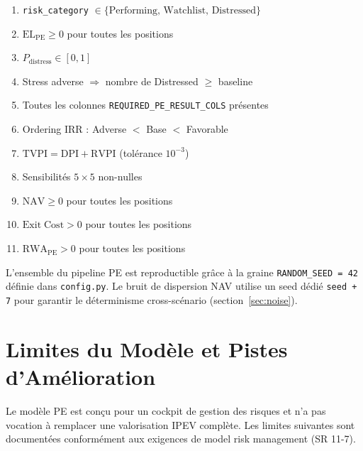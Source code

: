 \documentclass[12pt,a4paper]{article}
\begin{document}
\begin{enumerate}[label=\textbf{V\arabic*}]
    \item \texttt{risk\_category} $\in \{\text{Performing, Watchlist, Distressed}\}$
    \item $\mathrm{EL}_{\mathrm{PE}} \geq 0$ pour toutes les positions
    \item $P_{\mathrm{distress}} \in [0, 1]$
    \item Stress adverse $\Rightarrow$ nombre de Distressed $\geq$ baseline
    \item Toutes les colonnes \texttt{REQUIRED\_PE\_RESULT\_COLS} pr\'{e}sentes
    \item Ordering IRR : Adverse $<$ Base $<$ Favorable
    \item $\mathrm{TVPI} = \mathrm{DPI} + \mathrm{RVPI}$ (tol\'{e}rance $10^{-3}$)
    \item Sensibilit\'{e}s $5 \times 5$ non-nulles
    \item $\mathrm{NAV} \geq 0$ pour toutes les positions
    \item $\mathrm{Exit\;Cost} > 0$ pour toutes les positions
    \item $\mathrm{RWA}_{\mathrm{PE}} > 0$ pour toutes les positions
\end{enumerate}

\begin{definitionbox}[Reproductibilit\'{e}]
L'ensemble du pipeline PE est reproductible gr\^{a}ce \`{a} la graine \texttt{RANDOM\_SEED = 42}
d\'{e}finie dans \texttt{config.py}. Le bruit de dispersion NAV utilise un seed d\'{e}di\'{e}
\texttt{seed + 7} pour garantir le d\'{e}terminisme cross-sc\'{e}nario (section~\ref{sec:noise}).
\end{definitionbox}


\section{Limites du Mod\`{e}le et Pistes d'Am\'{e}lioration}
\label{sec:limitations}

Le mod\`{e}le PE est con\c{c}u pour un cockpit de gestion des risques et n'a pas
vocation \`{a} remplacer une valorisation IPEV compl\`{e}te. Les limites suivantes
sont document\'{e}es conform\'{e}ment aux exigences de model risk management (SR 11-7).
\end{document}
